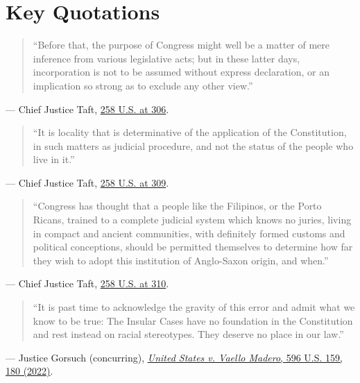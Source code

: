 \documentclass[12pt]{article}
\begin{document}
\section{Key Quotations}
\begin{quote}
``Before that, the purpose of Congress might well be a matter of mere inference from various legislative acts; but in these latter days, incorporation is not to be assumed without express declaration, or an implication so strong as to exclude any other view.''
\end{quote}
\noindent --- Chief Justice Taft, \href{https://supreme.justia.com/cases/federal/us/258/298/}{258 U.S. at 306}.

\begin{quote}
``It is locality that is determinative of the application of the Constitution, in such matters as judicial procedure, and not the status of the people who live in it.''
\end{quote}
\noindent --- Chief Justice Taft, \href{https://supreme.justia.com/cases/federal/us/258/298/}{258 U.S. at 309}.

\begin{quote}
``Congress has thought that a people like the Filipinos, or the Porto Ricans, trained to a complete judicial system which knows no juries, living in compact and ancient communities, with definitely formed customs and political conceptions, should be permitted themselves to determine how far they wish to adopt this institution of Anglo-Saxon origin, and when.''
\end{quote}
\noindent --- Chief Justice Taft, \href{https://en.wikisource.org/wiki/Balzac_v._Porto_Rico/Opinion_of_the_Court}{258 U.S. at 310}.

\begin{quote}
``It is past time to acknowledge the gravity of this error and admit what we know to be true: The Insular Cases have no foundation in the Constitution and rest instead on racial stereotypes. They deserve no place in our law.''
\end{quote}
\noindent --- Justice Gorsuch (concurring), \href{https://supreme.justia.com/cases/federal/us/596/20-303/}{\textit{United States v. Vaello Madero}, 596 U.S. 159, 180 (2022)}.
\end{document}

